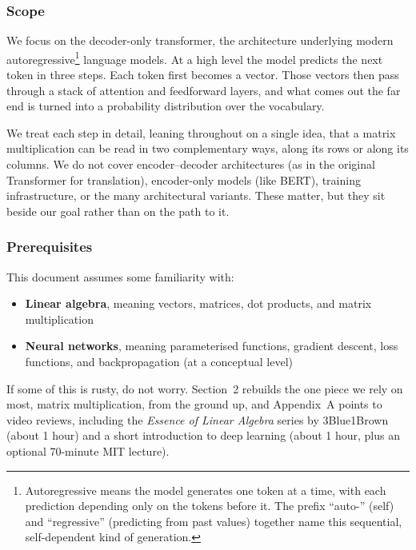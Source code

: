 \documentclass[11pt]{article}
\begin{document}
\subsubsection*{Scope}

We focus on the decoder-only transformer, the architecture underlying modern autoregressive\footnote{Autoregressive means the model generates one token at a time, with each prediction depending only on the tokens before it. The prefix ``auto-'' (self) and ``regressive'' (predicting from past values) together name this sequential, self-dependent kind of generation.} language models. At a high level the model predicts the next token in three steps. Each token first becomes a vector. Those vectors then pass through a stack of attention and feedforward layers, and what comes out the far end is turned into a probability distribution over the vocabulary.

We treat each step in detail, leaning throughout on a single idea, that a matrix multiplication can be read in two complementary ways, along its rows or along its columns. We do not cover encoder--decoder architectures (as in the original Transformer for translation), encoder-only models (like BERT), training infrastructure, or the many architectural variants. These matter, but they sit beside our goal rather than on the path to it.

\newpage
\subsubsection*{Prerequisites}

This document assumes some familiarity with:
\begin{itemize}
    \item \textbf{Linear algebra}, meaning vectors, matrices, dot products, and matrix multiplication
    \item \textbf{Neural networks}, meaning parameterised functions, gradient descent, loss functions, and backpropagation (at a conceptual level)
\end{itemize}
If some of this is rusty, do not worry. Section~2 rebuilds the one piece we rely on most, matrix multiplication, from the ground up, and Appendix~A points to video reviews, including the \textit{Essence of Linear Algebra} series by 3Blue1Brown (about 1 hour) and a short introduction to deep learning (about 1 hour, plus an optional 70-minute MIT lecture).
\end{document}
